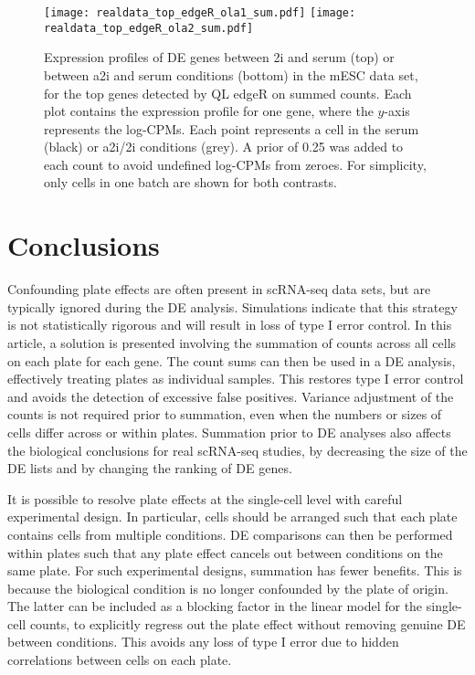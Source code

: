 \documentclass{article}
\begin{document}
\begin{figure}[bt]
    \begin{center}
        \texttt{[image: realdata\_top\_edgeR\_ola1\_sum.pdf]}
        \texttt{[image: realdata\_top\_edgeR\_ola2\_sum.pdf]}
    \end{center}
\caption{
    Expression profiles of DE genes between 2i and serum (top) or between a2i and serum conditions (bottom) in the mESC data set, 
        for the top genes detected by QL edgeR on summed counts.
    Each plot contains the expression profile for one gene, where the $y$-axis represents the log-CPMs.
    Each point represents a cell in the serum (black) or a2i/2i conditions (grey).
    A prior of 0.25 was added to each count to avoid undefined log-CPMs from zeroes.
    For simplicity, only cells in one batch are shown for both contrasts.
}
\label{fig:realdata}
\end{figure}


\section{Conclusions}
Confounding plate effects are often present in scRNA-seq data sets, but are typically ignored during the DE analysis.
Simulations indicate that this strategy is not statistically rigorous and will result in loss of type I error control. 
In this article, a solution is presented involving the summation of counts across all cells on each plate for each gene.
The count sums can then be used in a DE analysis, effectively treating plates as individual samples.
This restores type I error control and avoids the detection of excessive false positives.
Variance adjustment of the counts is not required prior to summation, even when the numbers or sizes of cells differ across or within plates.
Summation prior to DE analyses also affects the biological conclusions for real scRNA-seq studies, 
    by decreasing the size of the DE lists and by changing the ranking of DE genes.

It is possible to resolve plate effects at the single-cell level with careful experimental design.
In particular, cells should be arranged such that each plate contains cells from multiple conditions.
DE comparisons can then be performed within plates such that any plate effect cancels out between conditions on the same plate.
For such experimental designs, summation has fewer benefits.
This is because the biological condition is no longer confounded by the plate of origin.
The latter can be included as a blocking factor in the linear model for the single-cell counts, 
    to explicitly regress out the plate effect without removing genuine DE between conditions.
This avoids any loss of type I error due to hidden correlations between cells on each plate.
\end{document}
